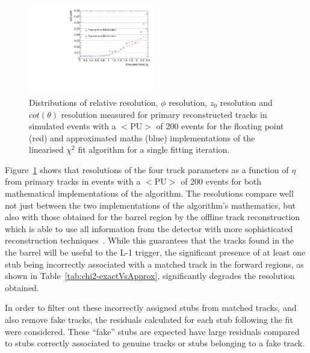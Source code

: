 \begin{figure}[htb]
\includegraphics[width=0.495\textwidth]{figs/tk-upgrade/results-chi2fitter/cotThetaResVsEta_It_1_ApproxVsExact.pdf}
\caption{
Distributions of \pt relative resolution, $\phi$ resolution, $z_{0}$ resolution and $cot(\theta)$ resolution measured for primary reconstructed tracks in simulated \ttbar events with a $<\textrm{PU}>$ of 200 events for the floating point (red) and approximated maths (blue) implementations of the linearised $\chi^{2}$ fit algorithm for a single fitting iteration.
}
\label{fig:chi2HelixParametersResVsEtaApproxVsExact}
\end{figure}


Figure~\ref{fig:chi2HelixParametersResVsEtaApproxVsExact} shows that resolutions of the four track parameters as a function of $\eta$ from primary tracks in \ttbar events with a $<\textrm{PU}>$ of 200 events for both mathematical implementations of the algorithm.
The resolutions compare well not just between the two implementations of the algorithm's mathematics, but also with those obtained for the barrel region by the offline track reconstruction which is able to use all information from the detector with more sophisticated reconstruction techniques~\cite{P2TrackerTDR}.
While this guarantees that the tracks found in the the barrel will be useful to the L-1 trigger, the significant presence of at least one stub being incorrectly associated with a matched track in the forward regions, as shown in Table~\ref{tab:chi2-exactVsApprox}, significantly degrades the resolution obtained.

In order to filter out these incorrectly assigned stubs from matched tracks, and also remove fake tracks, the residuals calculated for each stub following the fit were considered.
These ``fake'' stubs are expected have large residuals compared to stubs correctly associated to genuine tracks or stubs belonging to a fake track.

